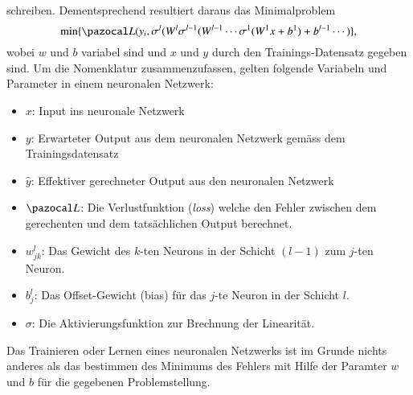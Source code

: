 schreiben. Dementsprechend resultiert daraus das Minimalproblem
\begin{equation}
	\min \{ \Lb(y_{i}, \sigma^{l}(W^{l}\sigma^{l-1}(W^{l-1}\cdots \sigma^{1}(W^{1}x+b^{1}) + b^{l-1} \cdots ) \} \text{,}
\end{equation}
wobei $w$ und $b$ variabel sind und $x$ und $y$ durch den Trainings-Datensatz gegeben sind.
Um die Nomenklatur zusammenzufassen, gelten folgende Variabeln und Parameter in einem neuronalen Netzwerk: 
\begin{itemize}
	\item{$x$: Input ins neuronale Netzwerk}
	\item{$y$: Erwarteter Output aus dem neuronalen Netzwerk gemäss dem Trainingsdatensatz}
	\item{$\hat{y}$: Effektiver gerechneter Output aus den neuronalen Netzwerk}
	\item{$\Lb$: Die Verlustfunktion (\textit{loss}) welche den Fehler zwischen dem gerechenten und dem tatsächlichen Output berechnet.}
	\item{$w_{jk}^{l}$: Das Gewicht des $k$-ten Neurons in der Schicht $(l-1)$ zum $j$-ten Neuron.}
	\item{$b_{j}^{l}$: Das Offset-Gewicht (bias) für das $j$-te Neuron in der Schicht $l$.}
	\item{$\sigma$: Die Aktivierungsfunktion zur Brechnung der Linearität.}
\end{itemize}
Das Trainieren oder Lernen eines neuronalen Netzwerks ist im Grunde nichts anderes als das bestimmen des Minimums des Fehlers mit Hilfe der Paramter $w$ und $b$ für die gegebenen Problemstellung. 